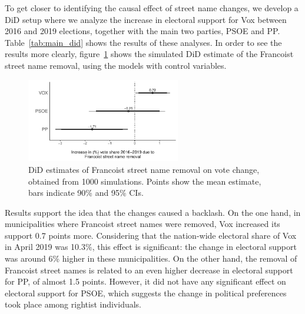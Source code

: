 \documentclass[12pt, notitlepage]{article}
\begin{document}
To get closer to identifying the causal effect of street name changes, we develop a DiD setup where we analyze the increase in electoral support for Vox between 2016 and 2019 elections, together with the main two parties, PSOE and PP.
Table~\ref{tab:main_did} shows the results of these analyses.
In order to see the results more clearly, figure~\ref{fig:main_did} shows the simulated DiD estimate of the Francoist street name removal, using the models with control variables.



\begin{figure}[htb!]
\centering

  \includegraphics[width = 0.6\textwidth]{img/DiD_estimates}

  \caption{DiD estimates of Francoist street name removal on vote change, obtained from 1000 simulations. Points show the mean estimate, bars indicate 90\% and 95\% CIs.}\label{fig:main_did}

\end{figure}

Results support the idea that the changes caused a backlash.
On the one hand, in municipalities where Francoist street names were removed, Vox increased its support 0.7 points more.
Considering that the nation-wide electoral share of Vox in April 2019 was 10.3\%, this effect is significant: the change in electoral support was around 6\% higher in these municipalities.
On the other hand, the removal of Francoist street names is related to an even higher decrease in electoral support for PP, of almost 1.5 points.
However, it did not have any significant effect on electoral support for PSOE, which suggests the change in political preferences took place among rightist individuals.
\end{document}
